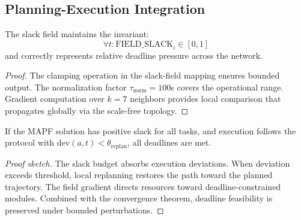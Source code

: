 \subsection{Planning-Execution Integration}

\begin{theorem}
The slack field maintains the invariant:
\begin{equation}
\forall t: \text{FIELD\_SLACK}_i \in [0, 1]
\end{equation}
and correctly represents relative deadline pressure across the network.
\end{theorem}

\begin{proof}
The clamping operation in the slack-field mapping ensures bounded output. The normalization factor $\tau_{\text{norm}} = 100$s covers the operational range. Gradient computation over $k=7$ neighbors provides local comparison that propagates globally via the scale-free topology.
\end{proof}

\begin{theorem}
If the MAPF solution has positive slack for all tasks, and execution follows the \hybridcbs{} protocol with $\text{dev}(a, t) < \theta_{\text{replan}}$, all deadlines are met.
\end{theorem}

\begin{proof}[Proof sketch]
The slack budget absorbs execution deviations. When deviation exceeds threshold, local replanning restores the path toward the planned trajectory. The field gradient directs resources toward deadline-constrained modules. Combined with the convergence theorem, deadline feasibility is preserved under bounded perturbations.
\end{proof}
